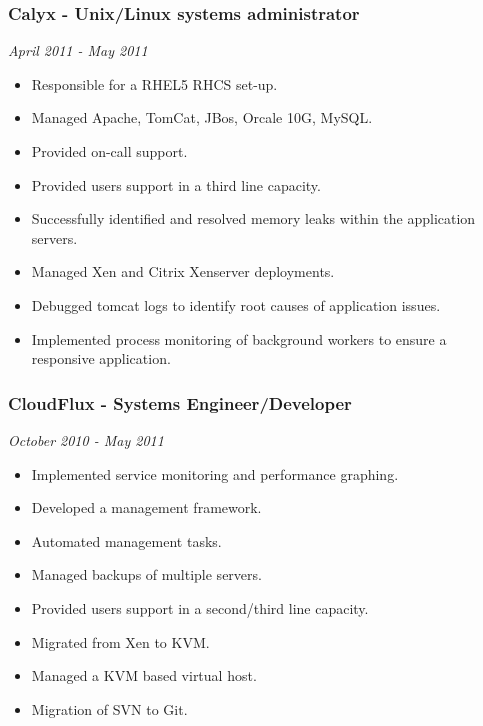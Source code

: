 \subsubsection{Calyx - Unix/Linux systems
administrator}\label{calyx---unixlinux-systems-administrator}

\emph{April 2011 - May 2011}

\begin{itemize}
\itemsep1pt\parskip0pt
\item
  Responsible for a RHEL5 RHCS set-up.
\item
  Managed Apache, TomCat, JBos, Orcale 10G, MySQL.
\item
  Provided on-call support.
\item
  Provided users support in a third line capacity.
\item
  Successfully identified and resolved memory leaks within the
  application servers.
\item
  Managed Xen and Citrix Xenserver deployments.
\item
  Debugged tomcat logs to identify root causes of application issues.
\item
  Implemented process monitoring of background workers to ensure a
  responsive application.
\end{itemize}

\subsubsection{CloudFlux - Systems
Engineer/Developer}\label{cloudflux---systems-engineerdeveloper}

\emph{October 2010 - May 2011}

\begin{itemize}
\itemsep1pt\parskip0pt
\item
  Implemented service monitoring and performance graphing.
\item
  Developed a management framework.
\item
  Automated management tasks.
\item
  Managed backups of multiple servers.
\item
  Provided users support in a second/third line capacity.
\item
  Migrated from Xen to KVM.
\item
  Managed a KVM based virtual host.
\item
  Migration of SVN to Git.
\end{itemize}

